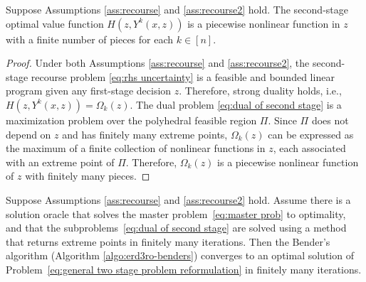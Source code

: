 \documentclass[onefignum,onetabnum]{siamart251216}
\begin{document}
\begin{lemma}\label{lemma:conv for nonlinear}
    Suppose Assumptions \ref{ass:recourse} and \ref{ass:recourse2} hold. The second-stage optimal value function $H(z,Y^k(x,z))$ is a piecewise nonlinear function in $z$ with a finite number of pieces for each $k\in[n]$.
\end{lemma}
\begin{proof}
Under both Assumptions \ref{ass:recourse} and \ref{ass:recourse2}, the second-stage recourse problem \eqref{eq:rhs uncertainty} is a feasible and bounded linear program given any first-stage decision $z$. Therefore, strong duality holds, i.e., $H(z,Y^k(x,z))=\Omega_k(z)$. The dual problem \eqref{eq:dual of second stage} is a maximization problem over the polyhedral feasible region $\Pi$. Since $\Pi$ does not depend on $z$ and has finitely many extreme points, $\Omega_k(z)$ can be expressed as the maximum of a finite collection of nonlinear functions in $z$, each associated with an extreme point of $\Pi$. Therefore, $\Omega_k(z)$ is a piecewise nonlinear function of $z$ with finitely many pieces.
\end{proof}


\begin{theorem}
Suppose Assumptions \ref{ass:recourse} and \ref{ass:recourse2} hold.  Assume there is a solution oracle that solves the master problem\ \eqref{eq:master prob} to optimality, and that the subproblems\ \eqref{eq:dual of second stage} are solved using a method that returns extreme points in finitely many iterations. Then the Bender's algorithm (Algorithm \ref{algo:erd3ro-benders}) converges to an optimal solution of Problem\ \eqref{eq:general two stage problem reformulation} in finitely many iterations.
\end{theorem}
\end{document}
